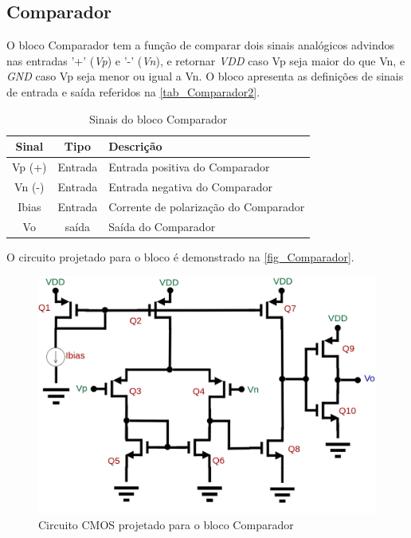 \renewcommand{\NomeBloco}{Comparador}
\renewcommand{\NomePTab}{tab_\NomeBloco}
\renewcommand{\NomeSTab}{tab_\NomeBloco2}
\renewcommand{\NomePFig}{fig_\NomeBloco}
\renewcommand{\NomeSFig}{fig_\NomeBloco2}
\renewcommand{\NomeTTab}{tab_\NomeBloco3}

\subsection{\NomeBloco}

O bloco \NomeBloco{} tem a fun{\c c}\~ao de comparar dois sinais anal\'ogicos advindos nas entradas '+' (\emph{Vp}) e '-' (\emph{Vn}), e retornar \emph{VDD} caso Vp seja maior do que Vn, e \emph{GND} caso Vp seja menor ou igual a Vn.  O bloco apresenta as defini{\c c}\~oes de sinais de entrada e sa\'ida referidos na \autoref{\NomeSTab}.

\begin{table}[htbp]
\caption{Sinais do bloco \NomeBloco}
\label{\NomeSTab}
\centering
\begin{tabular}{ccl}

    \toprule
    Sinal & Tipo    & Descri{\c c}\~ao        \\
    \midrule \midrule
    Vp (+) & Entrada & Entrada positiva do Comparador\\
    \midrule
    Vn (-) & Entrada & Entrada negativa do Comparador\\
    \midrule
    Ibias & Entrada & Corrente de polariza{\c c}\~ao do Comparador\\
    \midrule
    Vo & sa\'ida & Sa\'ida do Comparador\\
    \bottomrule
\end{tabular}
\end{table}

O circuito projetado para o bloco \'e demonstrado na \autoref{\NomePFig}.

\begin{figure}[htb]
 \label{\NomePFig}
 \centering
    \centering
    \caption{Circuito CMOS projetado para o bloco \NomeBloco} 
    \includegraphics[scale=0.4]{Circuitos/Comparator.png}
\end{figure}

